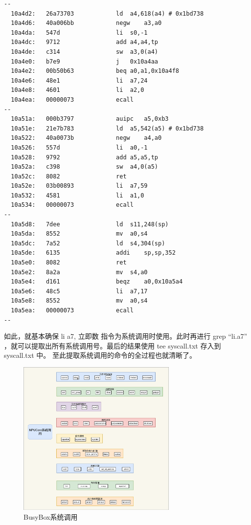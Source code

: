 \begin{lstlisting}[language={[RISC-V]Assembler}]
--
  10a4d2:	26a73703          	ld	a4,618(a4) # 0x1bd738
  10a4d6:	40a006bb          	negw	a3,a0
  10a4da:	547d                li	s0,-1
  10a4dc:	9712                add	a4,a4,tp
  10a4de:	c314                sw	a3,0(a4)
  10a4e0:	b7e9                j	0x10a4aa
  10a4e2:	00b50b63          	beq	a0,a1,0x10a4f8
  10a4e6:	48e1                li	a7,24
  10a4e8:	4601                li	a2,0
  10a4ea:	00000073          	ecall
--
  10a51a:	000b3797          	auipc	a5,0xb3
  10a51e:	21e7b783          	ld	a5,542(a5) # 0x1bd738
  10a522:	40a0073b          	negw	a4,a0
  10a526:	557d                li	a0,-1
  10a528:	9792                add	a5,a5,tp
  10a52a:	c398                sw	a4,0(a5)
  10a52c:	8082                ret
  10a52e:	03b00893          	li	a7,59
  10a532:	4581                li	a1,0
  10a534:	00000073          	ecall
--
  10a5d8:	7dee                ld	s11,248(sp)
  10a5da:	8552                mv	a0,s4
  10a5dc:	7a52                ld	s4,304(sp)
  10a5de:	6135                addi	sp,sp,352
  10a5e0:	8082                ret
  10a5e2:	8a2a                mv	s4,a0
  10a5e4:	d161                beqz	a0,0x10a5a4
  10a5e6:	48c5                li	a7,17
  10a5e8:	8552                mv	a0,s4
  10a5ea:	00000073          	ecall
--
\end{lstlisting}

如此，就基本确保 li a7, 立即数 指令为系统调用时使用。此时再进行 grep \enquote{li.a7} ，就可以提取出所有系统调用号。最后的结果使用 tee syscall.txt 存入到 syscall.txt 中。
至此提取系统调用的命令的全过程也就清晰了。

\begin{figure}[h]
    \centering
    \includegraphics[width=0.7\textwidth]{figures/09-03-NPUCore系统调用.png}
    \caption{
        BusyBox系统调用
    }
    \label{fig:BusyBox系统调用}
\end{figure}
